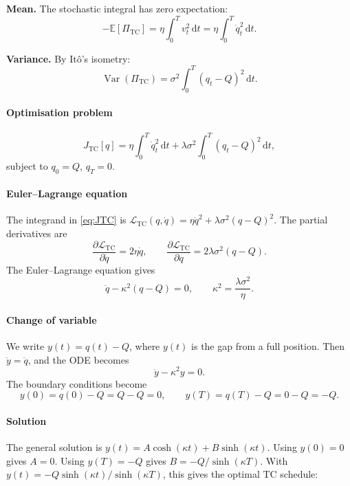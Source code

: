 \documentclass[12pt, a4paper]{article}
\newcommand{\E}{\mathbb{E}}
\newcommand{\Var}{\operatorname{Var}}
\newcommand{\dd}{\,\mathrm{d}}
\newcommand{\kap}{\kappa}
\begin{document}
\textbf{Mean.} The stochastic integral has zero expectation:
\[
  -\E[\Pi_{\mathrm{TC}}] = \eta\!\int_0^T v_t^2 \dd t = \eta\!\int_0^T \dot q_t^2 \dd t.
\]

\textbf{Variance.} By It\^{o}'s isometry:
\[
  \Var(\Pi_{\mathrm{TC}})
  = \sigma^2\!\int_0^T (q_t - Q)^2 \dd t.
\]

\paragraph{Optimisation problem}

\begin{equation}
  J_{\mathrm{TC}}[q]
  = \eta\!\int_0^T \dot q_t^2 \dd t + \lambda\sigma^2\!\int_0^T (q_t - Q)^2 \dd t,
  \label{eq:JTC}
\end{equation}
subject to $q_0 = Q$, $q_T = 0$.

\paragraph{Euler--Lagrange equation}

The integrand in \eqref{eq:JTC} is $\mathcal{L}_{\mathrm{TC}}(q, \dot q) = \eta\dot q^2 + \lambda\sigma^2(q - Q)^2$.
The partial derivatives are
\[
  \frac{\partial\mathcal{L}_{\mathrm{TC}}}{\partial\dot q} = 2\eta\dot q,
  \qquad
  \frac{\partial\mathcal{L}_{\mathrm{TC}}}{\partial q} = 2\lambda\sigma^2(q - Q).
\]
The Euler--Lagrange equation gives
\[
  \ddot q - \kap^2(q - Q) = 0, \qquad \kap^2 = \frac{\lambda\sigma^2}{\eta}.
\]

\paragraph{Change of variable}

We write $y(t) = q(t) - Q$, where $y(t)$ is the gap from a full position.
Then $\ddot y = \ddot q$, and the ODE becomes
\[
  \ddot y - \kap^2 y = 0.
\]
The boundary conditions become
\[
  y(0) = q(0) - Q = Q - Q = 0, \qquad y(T) = q(T) - Q = 0 - Q = -Q.
\]

\paragraph{Solution}

The general solution is $y(t) = A\cosh(\kap t) + B\sinh(\kap t)$.
Using $y(0) = 0$ gives $A = 0$.
Using $y(T) = -Q$ gives $B = -Q/\sinh(\kap T)$.
With $y(t) = -Q\sinh(\kap t)/\sinh(\kap T)$, this gives the optimal TC schedule:
\end{document}

